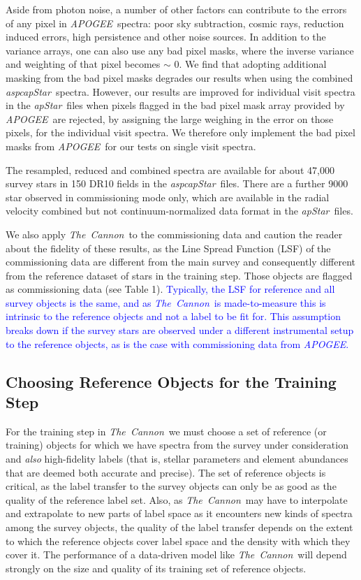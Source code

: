 \documentclass[12pt, preprint]{aastex}
\newcommand{\tc}{\textsl{The~Cannon}}
\newcommand{\apogee}{\textsl{APOGEE}}
\newcommand{\aspcapstar}{\textsl{aspcapStar}}
\newcommand{\apstar}{\textsl{apStar}}
\begin{document}
Aside from photon noise, a number of other factors can contribute to the errors of any pixel in \apogee\ spectra: poor sky subtraction, cosmic rays, reduction induced errors, high persistence and other noise sources. In addition to the variance arrays, one can also use any bad pixel masks, where the
inverse variance and weighting of that pixel becomes $\sim$ 0. We find that adopting additional masking from the bad pixel masks degrades our results when using the combined \aspcapstar\ spectra. However, our results are improved for individual visit spectra in the \apstar\ files when pixels flagged in the bad pixel mask array provided by \apogee\ are rejected, by assigning the large weighing in the error on those pixels, for the individual visit spectra. We therefore only implement the bad pixel masks from \apogee\ for our tests on single visit spectra. 

The resampled, reduced and combined spectra are available for about 47,000 survey stars in 150 DR10 fields in the \aspcapstar\ files. There are a further 9000 star observed in commissioning mode only, which are available in the radial velocity combined but not continuum-normalized data format in the \apstar\ files.

We also apply \tc\ to the commissioning data and caution the reader about the fidelity of these results, as the Line Spread Function (LSF) of the commissioning data are different from the main survey and consequently different from the reference dataset of stars in the training step. Those objects are flagged as commissioning data (see Table 1). 
\textcolor{blue}{Typically, the LSF for reference and all survey objects is the same, and as \tc\ is made-to-measure this is intrinsic to the reference objects and not a label to be fit for. This assumption breaks down if the survey stars are observed under a different instrumental setup to the reference objects, as is the case with commissioning data from \apogee.}  

\subsection{Choosing Reference Objects for the Training Step}
\label{sec:ReferenceObjects}

For the training step in \tc\ we must choose a set of reference (or training) objects for which we have spectra from the survey under consideration and \emph{also} high-fidelity labels (that is, stellar parameters and element abundances that are deemed both accurate and precise).
The set of reference objects is critical, as the label transfer to the survey objects can only be as good as the quality of the reference label set. 
Also, as \tc\ may have to interpolate and extrapolate to new parts of label space as
it encounters new kinds of spectra among the survey objects, the quality
of the label transfer depends on the extent to which the reference objects
cover label space and the density with which they cover it.
The performance of a data-driven model like \tc\ will depend strongly on the size and quality of its training set of reference objects.
\end{document}
